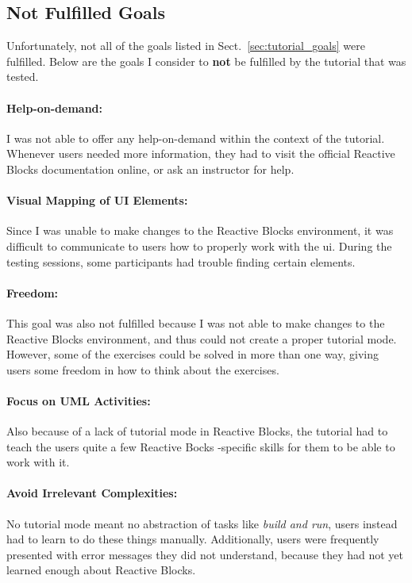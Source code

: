 \subsection{Not Fulfilled Goals}
Unfortunately, not all of the goals listed in Sect.~\ref{sec:tutorial_goals} were fulfilled. Below are the goals I consider to \textbf{not} be fulfilled by the tutorial that was tested.

\paragraph{Help-on-demand:} I was not able to offer any help-on-demand within the context of the tutorial. Whenever users needed more information, they had to visit the official Reactive Blocks documentation online, or ask an instructor for help.

\paragraph{Visual Mapping of UI Elements:} Since I was unable to make changes to the Reactive Blocks environment, it was difficult to communicate to users how to properly work with the \gls{ui}. During the testing sessions, some participants had trouble finding certain elements.

\paragraph{Freedom:} This goal was also not fulfilled because I was not able to make changes to the Reactive Blocks environment, and thus could not create a proper tutorial mode. However, some of the exercises could be solved in more than one way, giving users some freedom in how to think about the exercises.

\paragraph{Focus on UML Activities:} Also because of a lack of tutorial mode in Reactive Blocks, the tutorial had to teach the users quite a few Reactive Bocks -specific skills for them to be able to work with it.

\paragraph{Avoid Irrelevant Complexities:} No tutorial mode meant no abstraction of tasks like \emph{build and run}, users instead had to learn to do these things manually. Additionally, users were frequently presented with error messages they did not understand, because they had not yet learned enough about Reactive Blocks.

